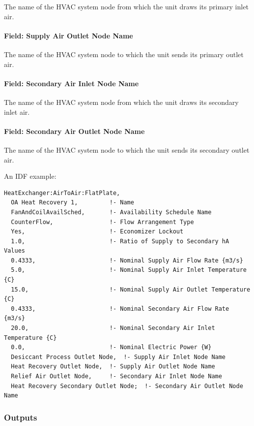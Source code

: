 The name of the HVAC system node from which the unit draws its primary inlet air.

\paragraph{Field: Supply Air Outlet Node Name}\label{field-supply-air-outlet-node-name-000}

The name of the HVAC system node to which the unit sends its primary outlet air.

\paragraph{Field: Secondary Air Inlet Node Name}\label{field-secondary-air-inlet-node-name-001}

The name of the HVAC system node from which the unit draws its secondary inlet air.

\paragraph{Field: Secondary Air Outlet Node Name}\label{field-secondary-air-outlet-node-name-000}

The name of the HVAC system node to which the unit sends its secondary outlet air.

An IDF example:

\begin{lstlisting}
HeatExchanger:AirToAir:FlatPlate,
  OA Heat Recovery 1,         !- Name
  FanAndCoilAvailSched,       !- Availability Schedule Name
  CounterFlow,                !- Flow Arrangement Type
  Yes,                        !- Economizer Lockout
  1.0,                        !- Ratio of Supply to Secondary hA Values
  0.4333,                     !- Nominal Supply Air Flow Rate {m3/s}
  5.0,                        !- Nominal Supply Air Inlet Temperature {C}
  15.0,                       !- Nominal Supply Air Outlet Temperature {C}
  0.4333,                     !- Nominal Secondary Air Flow Rate {m3/s}
  20.0,                       !- Nominal Secondary Air Inlet Temperature {C}
  0.0,                        !- Nominal Electric Power {W}
  Desiccant Process Outlet Node,  !- Supply Air Inlet Node Name
  Heat Recovery Outlet Node,  !- Supply Air Outlet Node Name
  Relief Air Outlet Node,     !- Secondary Air Inlet Node Name
  Heat Recovery Secondary Outlet Node;  !- Secondary Air Outlet Node Name
\end{lstlisting}

\subsubsection{Outputs}\label{outputs-014}


